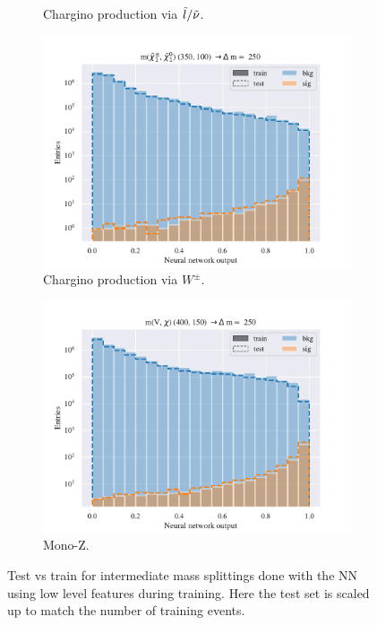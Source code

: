\begin{figure}[H]
\begin{subfigure}[t!]{0.49\textwidth}
        \caption{Chargino production via $\Tilde{l}/\Tilde{\nu}$.}
        \label{fig:}
    \end{subfigure}    
    \begin{subfigure}[t!]{0.49\textwidth}
        \includegraphics[width = \textwidth]{Figures/WW/NN/Low_level/Inter/scaled_train_test_395320.pdf}
        \caption{Chargino production via $W^\pm$.}
        \label{fig:}
    \end{subfigure}
    \begin{subfigure}[t!]{0.49\textwidth}
        \includegraphics[width = \textwidth]{Figures/Mono_Z/ML/NN/Low_level/Inter/scaled_train_test_310613.pdf}
        \caption{Mono-Z.}
        \label{fig:}
    \end{subfigure}
    \caption{Test vs train for intermediate mass splittings done with the NN using low level features during training. Here the test set is scaled up to match the number of training events.}
    \label{fig:}
\end{figure}


